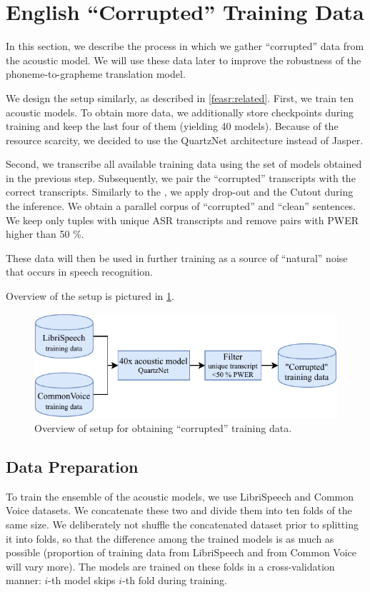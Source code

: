 \section{English ``Corrupted'' Training Data}
\label{sec:asr_corrupted}

In this section, we describe the process in which we gather ``corrupted'' data from the acoustic model. We will use these data later to improve the robustness of the phoneme-to-grapheme translation model.

We design the setup similarly, as described in \cref{feasr:related}. First, we train ten acoustic models. To obtain more data, we additionally store checkpoints during training and keep the last four of them (yielding 40 models). Because of the resource scarcity, we decided to use the QuartzNet architecture instead of Jasper.

Second, we transcribe all available training data using the set of models obtained in the previous step. Subsequently, we pair the ``corrupted'' transcripts with the correct transcripts. Similarly to the , we apply drop-out and the Cutout during the inference. We obtain a parallel corpus of ``corrupted'' and ``clean'' sentences. We keep only tuples with unique ASR transcripts and remove pairs with PWER higher than 50 \%.

These data will then be used in further training as a source of ``natural'' noise that occurs in speech recognition.

Overview of the setup is pictured in \cref{fig:asr_folds}.

\begin{figure}[t]
	\includegraphics[width=\linewidth]{img/ensemble_diagram}
	\caption{Overview of setup for obtaining ``corrupted'' training data.}
	\label{fig:asr_folds}
\end{figure}

\subsection{Data Preparation}
To train the ensemble of the acoustic models, we use LibriSpeech and Common Voice datasets. We concatenate these two and divide them into ten folds of the same size. We deliberately not shuffle the concatenated dataset prior to splitting it into folds, so that the difference among the trained models is as much as possible (proportion of training data from LibriSpeech and from Common Voice will vary more). The models are trained on these folds in a cross-validation manner: $i$-th model skips $i$-th fold during training.


